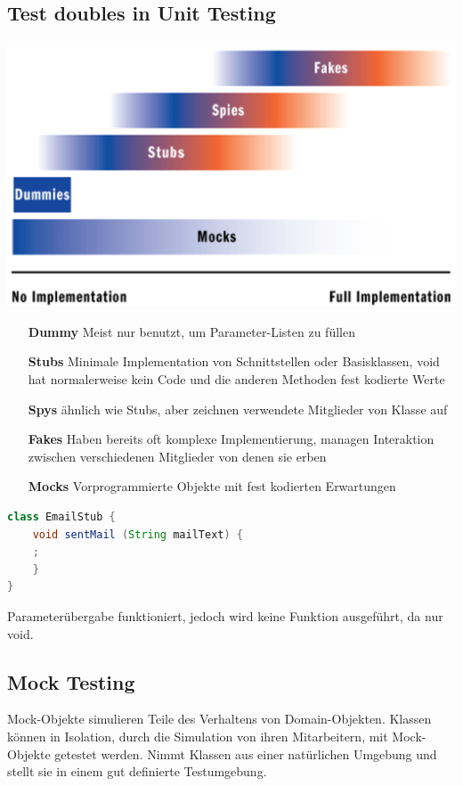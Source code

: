 \documentclass[a4paper,10pt]{article}
\newcommand{\Bold}[1]{\textbf{#1}} %
\begin{document}
\subsection{Test doubles in Unit Testing}
\includegraphics[scale=0.8]{test_doubles.png}
\begin{itemize}
	\item[\Bold {Dummy}] Meist nur benutzt, um Parameter-Listen zu f\"{u}llen 
	\item[\Bold {Stubs}] Minimale Implementation von Schnittstellen oder Basisklassen, void hat  normalerweise kein Code und die anderen Methoden fest kodierte Werte
	\item[\Bold {Spys}] \"{a}hnlich wie Stubs, aber zeichnen verwendete Mitglieder von Klasse auf
	\item[\Bold {Fakes}]Haben bereits oft komplexe Implementierung, managen Interaktion zwischen verschiedenen Mitglieder von denen sie erben
	\item[\Bold {Mocks}] Vorprogrammierte Objekte mit fest kodierten Erwartungen
\end{itemize}
\begin{lstlisting}[language=Java,caption=Beispiel von Stub, style=MyJavaStyle]
class EmailStub {
    void sentMail (String mailText) {
    ;
    }
}
\end{lstlisting}
Parameter\"{u}bergabe funktioniert, jedoch wird keine Funktion ausgef\"{u}hrt, da nur void.

\subsection{Mock Testing}
Mock-Objekte simulieren Teile des Verhaltens von Domain-Objekten. Klassen k\"{o}nnen in Isolation, durch die Simulation von ihren Mitarbeitern, mit Mock-Objekte getestet werden. Nimmt Klassen aus einer nat\"{u}rlichen Umgebung und stellt sie in einem gut definierte Testumgebung.
\end{document}
